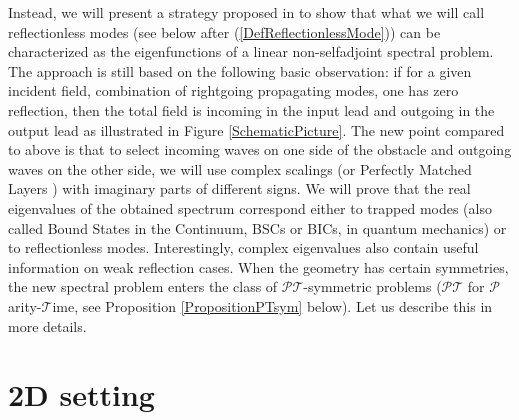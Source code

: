 \documentclass[11pt,a4paper]{report}
\begin{document}
\noindent Instead, we will present a strategy proposed in \cite{BoCP18} to show that what we will call reflectionless modes (see below after (\ref{DefReflectionlessMode})) can be characterized as the eigenfunctions of a linear non-selfadjoint spectral problem. The approach is still based on the following basic observation: if for a given incident field, combination of rightgoing propagating modes, one has zero reflection, then the total field is incoming in the input lead and outgoing in the output lead as illustrated in Figure \ref{SchematicPicture}. The new point compared to above is that to select incoming waves on one side of the obstacle and outgoing  waves on the other side, we will use complex scalings \cite{aguilar1971class,balslev1971spectral} (or Perfectly Matched Layers \cite{Bera94}) with imaginary parts of different signs. We will prove that the real eigenvalues of the obtained spectrum correspond either to trapped modes (also called Bound States in the Continuum, BSCs or BICs, in quantum mechanics) or to reflectionless modes. Interestingly, complex eigenvalues also contain useful information on weak reflection cases. When the geometry has certain symmetries, the new spectral problem enters the class of $\mathcal{PT}$-symmetric problems ($\mathcal{PT}$ for $\mathcal{P}$arity-$\mathcal{T}$ime, see Proposition \ref{PropositionPTsym} below). Let us describe this in more details. 


\section{2D setting}\label{SectionSetting}
\end{document}
